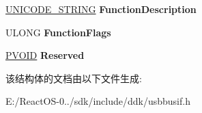 \begin{DoxyCompactItemize}
\item 
\mbox{\label{struct___u_s_b_c___f_u_n_c_t_i_o_n___d_e_s_c_r_i_p_t_o_r_a335edd713d63bfe45759dbe41e2557c8}} 
\hyperlink{struct___u_n_i_c_o_d_e___s_t_r_i_n_g}{U\+N\+I\+C\+O\+D\+E\+\_\+\+S\+T\+R\+I\+NG} {\bfseries Function\+Description}
\item 
\mbox{\label{struct___u_s_b_c___f_u_n_c_t_i_o_n___d_e_s_c_r_i_p_t_o_r_a8173e8aa97a0079271973a4f6ae6c0dd}} 
U\+L\+O\+NG {\bfseries Function\+Flags}
\item 
\mbox{\label{struct___u_s_b_c___f_u_n_c_t_i_o_n___d_e_s_c_r_i_p_t_o_r_aaf113b1492b3b729bb86bcbf8e7f6a17}} 
\hyperlink{interfacevoid}{P\+V\+O\+ID} {\bfseries Reserved}
\end{DoxyCompactItemize}


该结构体的文档由以下文件生成\+:\begin{DoxyCompactItemize}
\item 
E\+:/\+React\+O\+S-\/0../sdk/include/ddk/usbbusif.\+h\end{DoxyCompactItemize}
